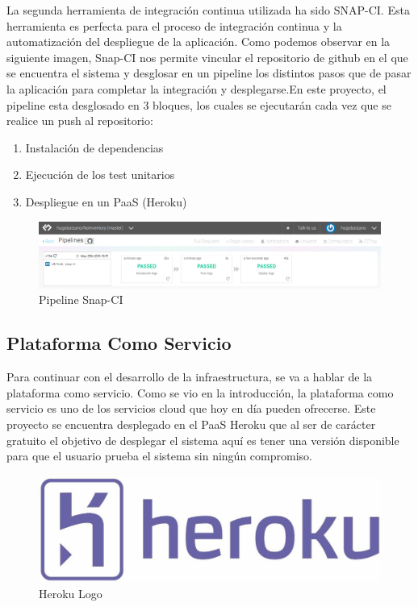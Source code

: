 \documentclass[a4paper,11pt]{book}
\begin{document}
La segunda herramienta de integración continua utilizada ha sido SNAP-CI\cite{snap}. Esta herramienta es perfecta para el proceso de integración continua y la automatización del despliegue de la aplicación. Como podemos observar en la siguiente imagen, Snap-CI nos permite vincular el repositorio de github en el que se encuentra el sistema y desglosar en un pipeline los distintos pasos que de pasar la aplicación para completar la integración y desplegarse.En este proyecto, el pipeline esta desglosado en 3 bloques, los cuales se ejecutarán cada vez que se realice un push al repositorio:

\begin{enumerate}
\item Instalación de dependencias
\item Ejecución de los test unitarios
\item Despliegue en un PaaS (Heroku)  
\end{enumerate}

\begin{figure}[H] 
\centering 
\includegraphics[scale=0.30]{imagenes/desarrollo_herramienta/snp_ci.png}
\caption{ Pipeline Snap-CI\cite{snapP}  }  
\end{figure}  	





\subsection{Plataforma Como Servicio}

Para continuar con el desarrollo de la infraestructura, se va a hablar de la plataforma como servicio. Como se vio en la introducción, la plataforma como servicio es uno de los servicios cloud que hoy en día pueden ofrecerse. Este proyecto se encuentra desplegado en el PaaS Heroku\cite{hero} que al ser de carácter gratuito el objetivo de desplegar el sistema aquí es tener una versión disponible para que el usuario prueba el sistema sin ningún compromiso.

\begin{figure}[H] 
\centering 
\includegraphics[scale=0.30]{imagenes/desarrollo_herramienta/heroku.jpg}
\caption{ Heroku Logo\cite{heroL}  }  
\end{figure}  	
 
\end{document}

